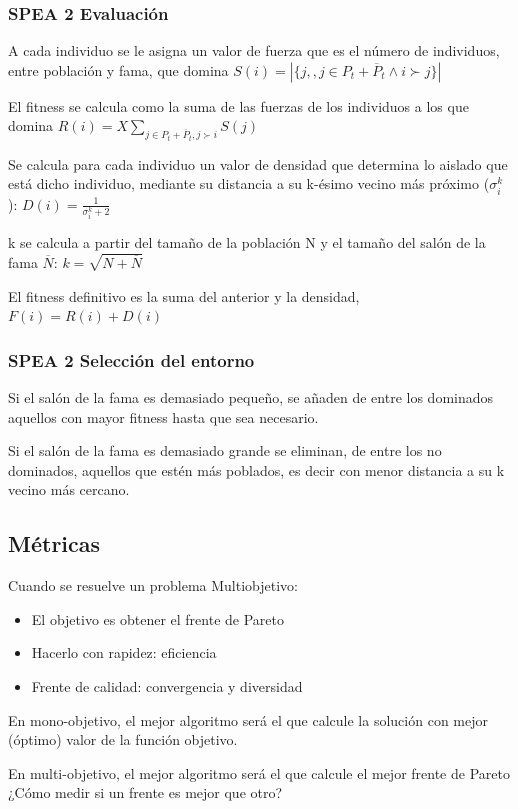 \documentclass[12pt, twoside, openright]{report} %
\begin{document}
\subsubsection{SPEA 2 Evaluación}
A cada individuo se le asigna un valor de fuerza que es el número de individuos, entre población y fama, que domina $S(i) = |\{j, , j \in P_t + \overline{P}_t \wedge i \succ j\}|$

El fitness se calcula como la suma de las fuerzas de los individuos a los que domina $R(i) = X \sum_{j\in P_t+\overline{P}_t,j\succ i} S(j)$

Se calcula para cada individuo un valor de densidad que determina lo aislado que está dicho individuo, mediante su distancia a su k-ésimo vecino más próximo ($\sigma_i^k$): $D(i)= \frac{1}{\sigma^k_i + 2}$

k se calcula a partir del tamaño de la población N y el tamaño del salón de la fama $\overline{N}$: $k = \sqrt{N+\overline{N}}$

El fitness definitivo es la suma del anterior y la densidad, $F(i) = R(i) + D(i)$

\subsubsection{SPEA 2 Selección del entorno}
Si el salón de la fama es demasiado pequeño, se añaden de entre los dominados aquellos con mayor fitness hasta que sea necesario.

Si el salón de la fama es demasiado grande se eliminan, de entre los no dominados, aquellos que estén más poblados, es decir con menor distancia a su k vecino más cercano.
\pagebreak
\subsection{Métricas}
Cuando se resuelve un problema Multiobjetivo:
\begin{itemize}
	\item El objetivo es obtener el frente de Pareto
	\item Hacerlo con rapidez: eficiencia
	\item Frente de calidad: convergencia y diversidad
\end{itemize}
En mono-objetivo, el mejor algoritmo será el que calcule la solución con mejor (óptimo) valor de la función objetivo.

En multi-objetivo, el mejor algoritmo será el que calcule el mejor frente de Pareto ¿Cómo medir si un frente es mejor que otro?
\end{document}
